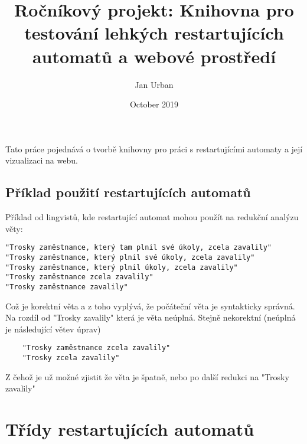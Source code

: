 \documentclass{article}
\title{ Ročníkový projekt: Knihovna pro testování lehkých restartujících automatů a webové prostředí}
\author{Jan Urban }
\date{October 2019}
\begin{document}
\maketitle

Tato práce pojednává o tvorbě knihovny pro práci s restartujícími automaty a její vizualizaci na webu.
\subsection{Příklad použití restartujících automatů}
Příklad od lingvistů, kde restartující automat mohou použít na redukční analýzu věty:

\begin{verbatim}
"Trosky zaměstnance, který tam plnil své úkoly, zcela zavalily"
"Trosky zaměstnance, který plnil své úkoly, zcela zavalily"
"Trosky zaměstnance, který plnil úkoly, zcela zavalily"
"Trosky zaměstnance zcela zavalily"
"Trosky zaměstnance zavalily"
\end{verbatim}

Což je korektní věta a z toho vyplývá, že počáteční věta je syntakticky správná. Na rozdíl od "Trosky zavalily" která je věta neúplná. Stejně nekorektní (neúplná je následující větev úprav)

\begin{verbatim}
	"Trosky zaměstnance zcela zavalily"
	"Trosky zcela zavalily"
\end{verbatim}

Z čehož je už možné zjistit že věta je špatně, nebo po další redukci na "Trosky zavalily"

\section{Třídy restartujících automatů}
\end{document}
